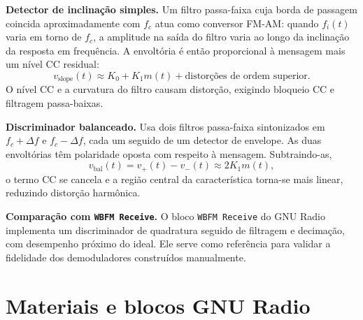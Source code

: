 \documentclass[11pt,a4paper]{article}
\begin{document}
\textbf{Detector de inclinação simples.} Um filtro passa-faixa cuja borda
de passagem coincida aproximadamente com $f_c$ atua como conversor FM-AM:
quando $f_i(t)$ varia em torno de $f_c$, a amplitude na saída do filtro
varia ao longo da inclinação da resposta em frequência. A envoltória é
então proporcional à mensagem mais um nível CC residual:
\begin{equation}
  v_\text{slope}(t) \approx K_0 + K_1 m(t) + \text{distorções de ordem superior}.
\end{equation}
O nível CC e a curvatura do filtro causam distorção, exigindo bloqueio CC e
filtragem passa-baixas.

\textbf{Discriminador balanceado.} Usa dois filtros passa-faixa
sintonizados em $f_c + \Delta f$ e $f_c - \Delta f$, cada um seguido de um
detector de envelope. As duas envoltórias têm polaridade oposta com respeito
à mensagem. Subtraindo-as,
\begin{equation}
  v_\text{bal}(t) = v_+(t) - v_-(t) \approx 2 K_1 m(t),
  \label{eq:balanced}
\end{equation}
o termo CC se cancela e a região central da característica torna-se mais
linear, reduzindo distorção harmônica.

\textbf{Comparação com \texttt{WBFM Receive}.} O bloco \texttt{WBFM Receive}
do GNU Radio implementa um discriminador de quadratura seguido de filtragem
e decimação, com desempenho próximo do ideal. Ele serve como referência
para validar a fidelidade dos demoduladores construídos manualmente.

\section{Materiais e blocos GNU Radio}
\end{document}
